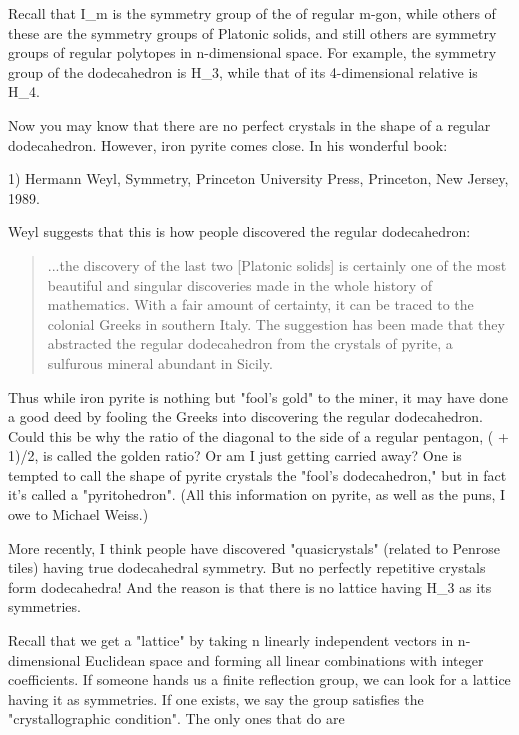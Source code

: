 Recall that I_{m} is the symmetry group of the of regular m-gon, while
others of these are the symmetry groups of Platonic solids, and still
others are symmetry groups of regular polytopes in n-dimensional
space.  For example, the symmetry group of the dodecahedron is H_{3}, 
while that of its 4-dimensional relative is H_{4}.  

Now you may know that there are no perfect crystals in the shape of a
regular dodecahedron.  However, iron pyrite comes close.  In his wonderful
book:

1) Hermann Weyl, Symmetry, Princeton University Press, Princeton, New
Jersey, 1989.

Weyl suggests that this is how people discovered the regular dodecahedron:

\begin{quote}
    ...the discovery of the last two [Platonic solids] is certainly
    one of the most beautiful and singular discoveries made in the
    whole history of mathematics.  With a fair amount of certainty, it
    can be traced to the colonial Greeks in southern Italy.  The
    suggestion has been made that they abstracted the regular
    dodecahedron from the crystals of pyrite, a sulfurous mineral
    abundant in Sicily.
\end{quote}

Thus while iron pyrite is nothing but "fool's gold" to the miner, it
may have done a good deed by fooling the Greeks into discovering the
regular dodecahedron.  Could this be why the ratio of the diagonal
to the side of a regular pentagon, ( + 1)/2, is called the golden
ratio?  Or am I just getting carried away?  One is tempted to call the
shape of pyrite crystals the "fool's dodecahedron," but in fact it's
called a "pyritohedron".  (All this information on pyrite, as well as
the puns, I owe to Michael Weiss.)

More recently, I think people have discovered "quasicrystals" (related to
Penrose tiles) having true dodecahedral symmetry.  But no perfectly
repetitive crystals form dodecahedra!  And the reason is that there is no
lattice having H_{3} as its symmetries.

Recall that we get a "lattice" by taking n linearly independent vectors
in n-dimensional Euclidean space and forming all linear combinations
with integer coefficients.  If someone hands us a finite reflection group,
we can look for a lattice having it as symmetries.  If one exists, 
we say the group satisfies the "crystallographic condition".  The only
ones that do are

